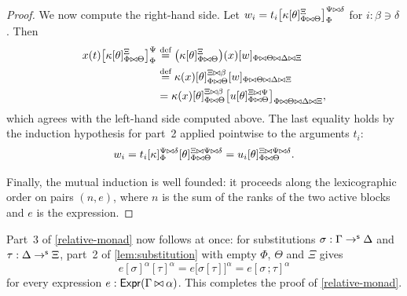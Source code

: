 \begin{proof}
    We now compute the right-hand side. Let $w_i = t_i\big[\kappa[\theta]_{\Phi \mathbin{\bowtie} \Theta}^{\Xi}\big]_\Phi^{\Psi \mathbin{\bowtie} \delta}$ for $i : \beta \ni \delta$. Then
    \begin{align*}
        x(t)\big[\kappa[\theta]_{\Phi \mathbin{\bowtie} \Theta}^{\Xi}\big]_\Phi^\Psi
        &\overset{\textnormal{def}}{=} \big(\kappa[\theta]_{\Phi \mathbin{\bowtie} \Theta}^{\Xi}\big)(x)[w]_{\Phi \mathbin{\bowtie} \Theta \mathbin{\bowtie} \Delta \mathbin{\bowtie} \Xi}\\
        &\overset{\textnormal{def}}{=} \kappa(x)[\theta]_{\Phi \mathbin{\bowtie} \Theta}^{\Xi \mathbin{\bowtie} \beta}[w]_{\Phi \mathbin{\bowtie} \Theta \mathbin{\bowtie} \Delta \mathbin{\bowtie} \Xi}\\
        &= \kappa(x)[\theta]_{\Phi \mathbin{\bowtie} \Theta}^{\Xi \mathbin{\bowtie} \beta}\big[u[\theta]_{\Phi \mathbin{\bowtie} \Theta}^{\Xi \mathbin{\bowtie} \Psi}\big]_{\Phi \mathbin{\bowtie} \Theta \mathbin{\bowtie} \Delta \mathbin{\bowtie} \Xi},
    \end{align*}
    which agrees with the left-hand side computed above. The last equality holds by the induction hypothesis for part~2 applied pointwise to the arguments $t_i$:
    \[
    w_i = t_i[\kappa]_\Phi^{\Psi \mathbin{\bowtie} \delta}[\theta]_{\Phi \mathbin{\bowtie} \Theta}^{\Xi \mathbin{\bowtie} \Psi \mathbin{\bowtie} \delta} = u_i[\theta]_{\Phi \mathbin{\bowtie} \Theta}^{\Xi \mathbin{\bowtie} \Psi \mathbin{\bowtie} \delta}.
    \]

    Finally, the mutual induction is well founded: it proceeds along the lexicographic order on pairs $(n, e)$, where $n$ is the sum of the ranks of the two active blocks and $e$ is the expression.
\end{proof}

Part~3 of \cref{relative-monad} now follows at once: for substitutions $\sigma : \Gamma \to^{\mathsf{s}} \Delta$ and $\tau : \Delta \to^{\mathsf{s}} \Xi$, part~2 of \cref{lem:substitution} with empty $\Phi$, $\Theta$ and $\Xi$ gives
\[
e[\sigma]^\alpha[\tau]^\alpha = e\big[\sigma[\tau]\big]^\alpha = e[\sigma \,; \tau]^\alpha
\]
for every expression $e : \mathsf{Expr}(\Gamma \mathbin{\bowtie} \alpha)$. This completes the proof of \cref{relative-monad}.

